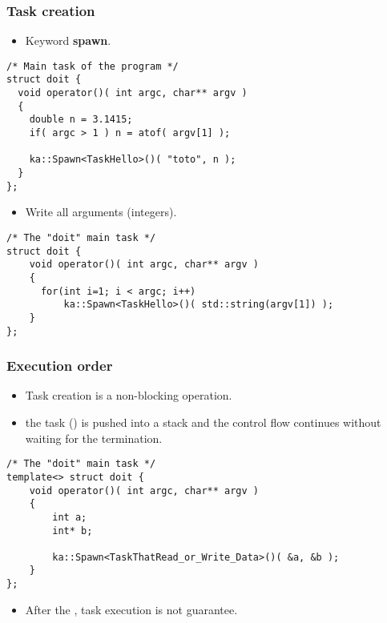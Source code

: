 \begin{frame}[fragile]
  \frametitle{Task creation}
  \begin{itemize}
  \item Keyword \textbf{spawn}.
  \end{itemize}
  \vspace*{-2mm}
\begin{block}{}
\begin{lstlisting}
/* Main task of the program */
struct doit {
  void operator()( int argc, char** argv )
  {
    double n = 3.1415;
    if( argc > 1 ) n = atof( argv[1] );

    ka::Spawn<TaskHello>()( "toto", n );
  }
};
\end{lstlisting}
\end{block}

\pause
%
  \begin{itemize}
  \item Write all arguments (integers).
  \end{itemize}
  \vspace*{-2mm}
\begin{block}{}
\begin{lstlisting}
/* The "doit" main task */
struct doit {
    void operator()( int argc, char** argv )
    {
      for(int i=1; i < argc; i++)
          ka::Spawn<TaskHello>()( std::string(argv[1]) );
    }
};
\end{lstlisting}
\end{block}
\end{frame}
\begin{frame}[fragile]
  \frametitle{Execution order}
  \begin{itemize}
  \item Task creation is a non-blocking operation.
  \item the task () is pushed into a stack and the control flow
    continues without waiting for the termination. 
  \end{itemize}
  \vspace*{-2mm}
  \pause
\begin{block}{}
\begin{lstlisting}
/* The "doit" main task */
template<> struct doit {
    void operator()( int argc, char** argv )
    {
        int a;
        int* b;

        ka::Spawn<TaskThatRead_or_Write_Data>()( &a, &b );
    }
};
\end{lstlisting}
\end{block}
  \pause
  \begin{itemize}
  \item After the , task execution is not guarantee.
  \end{itemize}
\end{frame}
